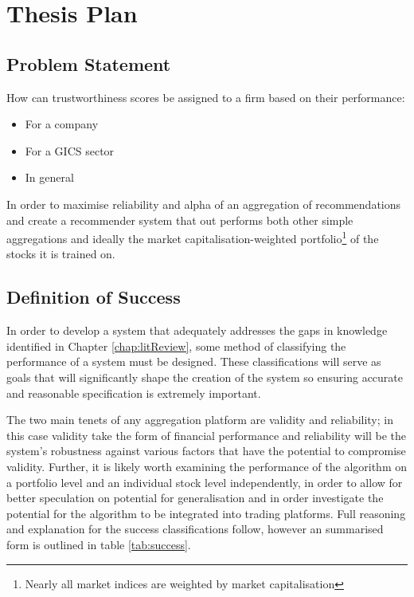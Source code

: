 \chapter{Thesis Plan}
\section{Problem Statement}
How can trustworthiness scores be assigned to a firm based on their performance:
\begin{itemize}
    \item For a company
    \item For a GICS sector
    \item In general
\end{itemize}
In order to maximise reliability and alpha of an aggregation of recommendations and create a recommender system that out performs both other simple aggregations and ideally the market capitalisation-weighted portfolio\footnote{Nearly all market indices are weighted by market capitalisation} of the stocks it is trained on.

\section{Definition of Success}\label{sec:success}
In order to develop a system that adequately addresses the gaps in knowledge identified in Chapter \ref{chap:litReview}, some method of classifying the performance of a system must be designed. These classifications will serve as goals that will significantly shape the creation of the system so ensuring accurate and reasonable specification is extremely important.

The two main tenets of any aggregation platform are validity and reliability; in this case validity take the form of financial performance and reliability will be the system's robustness against various factors that have the potential to compromise validity. Further, it is likely worth examining the performance of the algorithm on a portfolio level and an individual stock level independently, in order to allow for better speculation on potential for generalisation and in order investigate the potential for the algorithm to be integrated into trading platforms. Full reasoning and explanation for the success classifications follow, however an summarised form is outlined in table \ref{tab:success}.

